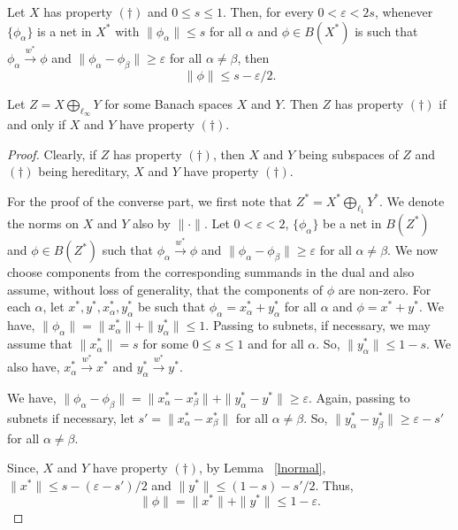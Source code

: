 \documentclass[10pt,a4paper]{amsart}
\newcommand{\e}{\varepsilon}
\begin{document}
\begin{lem} \label{lnormal}
	Let $X$ has property $(\dagger)$ and $0 \leq s \leq 1$. Then, for every $0 <\e <2s$, whenever $\{\phi_{\alpha}\}$ is a net in $X^*$ with $\|\phi_{\alpha}\| \leq s$ for all $\alpha$ and $\phi \in B(X^*)$ is such that $\phi_{\alpha} \xrightarrow{w^\ast} \phi$ and $\|\phi_{\alpha}-\phi_{\beta}\| \geq \e$ for all $\alpha \neq \beta$, then
	\[
	\|\phi\| \leq s - \e/2.
	\]
\end{lem}

\begin{prop} \label{tstab}
	Let $Z = X \bigoplus_{\ell_\infty} Y$ for some Banach spaces $X$ and $Y$. Then $Z$ has property $(\dagger)$ if and only if $X$ and $Y$ have property $(\dagger)$.
\end{prop}

\begin{proof}
	Clearly, if $Z$ has property $(\dagger)$, then $X$ and $Y$ being subspaces of $Z$ and $(\dagger)$ being hereditary,	$X$ and $Y$ have property $(\dagger)$.
	
	For the proof of the converse part, we first note that $Z^* = X^* \bigoplus_{\ell_1} Y^*$.
	We denote the norms on $X$ and $Y$ also by $\|\cdot\|$.
	Let $0 <\e <2$, $\{\phi_{\alpha}\}$ be a net in $B(Z^*)$ and $\phi \in B(Z^*)$ such that $\phi_{\alpha} \xrightarrow{w^\ast} \phi$ and $\|\phi_{\alpha}-\phi_{\beta}\| \geq \e$ for all $\alpha \neq \beta$. We now choose components from the corresponding summands in the dual and also assume, without loss of generality, that the components of $\phi$ are non-zero. For each $\alpha$, let $x^*,y^*,x_{\alpha}^*, y_{\alpha}^*$ be such that $\phi_{\alpha}=x_{\alpha}^* + y_{\alpha}^*$ for all $\alpha$ and $\phi=x^* + y^*$. We have, $\|\phi_\alpha\| = \|x_{\alpha}^*\|+\|y_{\alpha}^*\| \leq 1$. Passing to subnets, if necessary, we may assume that $\|x_{\alpha}^*\|=s$ for some $0 \leq s \leq 1$ and for all $\alpha$. So, $\|y_{\alpha}^*\| \leq 1-s$. We also have, $x_\alpha^* \xrightarrow{w^\ast} x^*$ and $y_\alpha^* \xrightarrow{w^*} y^*$.
	
	We have, $\|\phi_\alpha - \phi_\beta\|=\|x_\alpha^*-x_\beta^*\| + \|y_\alpha^*-y^*\| \geq \e$. Again, passing to subnets if necessary, let $s'=\|x_\alpha^*-x_\beta^*\|$ for all $\alpha \neq \beta$. So, $\|y_\alpha^*-y_\beta^*\| \geq \e-s'$ for all $\alpha \neq \beta$.
	
	Since, $X$ and $Y$ have property $(\dagger)$, by Lemma ~\ref{lnormal},
	$\|x^*\| \leq s - (\e-s')/2$ and $\|y^*\| \leq (1-s) - s'/2$. Thus,
	\[
	\|\phi\|=\|x^*\| + \|y^*\| \leq 1 - \e.
	\]
\end{proof}
\end{document}
